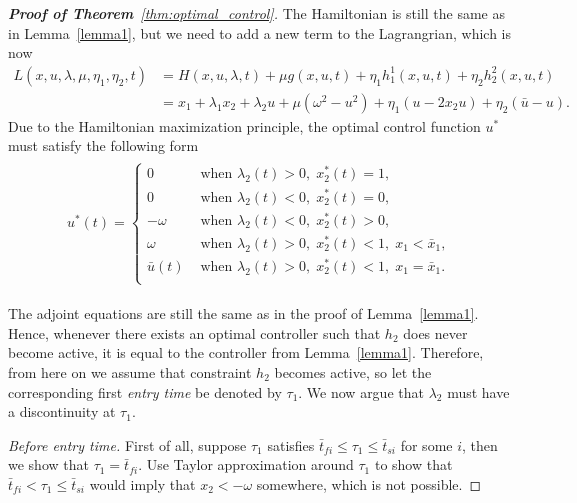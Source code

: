 \documentclass[a4paper]{article}
\theoremstyle{definition}
\theoremstyle{plain}
\begin{document}
\begin{proof}[\normalfont\textbf{Proof of Theorem}~\ref{thm:optimal_control}]
The Hamiltonian is still the same as in Lemma~\ref{lemma1}, but we need to add a new
term to the Lagrangrian, which is now
\begin{align*}
  L(x, u, \lambda, \mu, \eta_{1}, \eta_{2}, t) &= H(x,u,\lambda,t) + \mu g(x,u,t) + \eta_{1}h_{1}^{1}(x, u, t) + \eta_{2}h_{2}^{2}(x,u,t) \\
  &= x_{1} + \lambda_{1}x_{2} + \lambda_{2} u + \mu(\omega^{2} - u^{2}) + \eta_{1}(u - 2x_{2}u) + \eta_{2}(\bar{u} - u) .
\end{align*}
%
Due to the Hamiltonian maximization principle, the optimal control function
$u^{*}$ must satisfy the following form
\begin{align*}
  \begin{split}
  u^{*}(t) =
  \begin{cases}
  0 &\text{ when } \lambda_{2}(t) > 0, \; x^{*}_{2}(t) = 1 , \\
  0 &\text{ when } \lambda_{2}(t) < 0, \; x^{*}_{2}(t) = 0 , \\
  -\omega &\text{ when } \lambda_{2}(t) < 0, \; x^{*}_{2}(t) > 0 , \\
  \omega &\text{ when } \lambda_{2}(t) > 0, \; x^{*}_{2}(t) < 1, \; x_{1} < \bar{x}_{1} , \\
  \bar{u}(t) &\text{ when } \lambda_{2}(t) > 0, \; x^{*}_{2}(t) < 1, \; x_{1} = \bar{x}_{1} . \\
  \end{cases}
  \end{split}
\end{align*}

The adjoint equations are still the same as in the proof of Lemma~\ref{lemma1}. Hence,
whenever there exists an optimal controller such that $h_{2}$ does never become
active, it is equal to the controller from Lemma~\ref{lemma1}. Therefore, from here on we
assume that constraint $h_{2}$ becomes active, so let the corresponding first \textit{entry time}
be denoted by $\tau_{1}$.
%
We now argue that $\lambda_{2}$ must have a discontinuity at $\tau_{1}$.

\vspace{0.5em}
\noindent
\textit{Before entry time.}\;
First of all, suppose $\tau_{1}$ satisfies
$\bar{t}_{fi} \leq \tau_{1} \leq \bar{t}_{si}$ for some $i$, then we show that
$\tau_{1} = \bar{t}_{fi}$. {\color{Navy} Use Taylor approximation around
  $\tau_{1}$ to show that $\bar{t}_{fi} < \tau_{1} \leq \bar{t}_{si}$ would
  imply that $x_{2} < -\omega$ somewhere, which is not possible.}


\end{proof}
\end{document}
